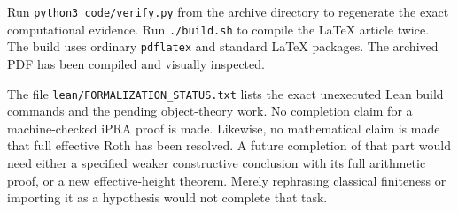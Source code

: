 Run \texttt{python3 code/verify.py} from the archive directory to regenerate
the exact computational evidence.  Run \texttt{./build.sh} to compile the
LaTeX article twice.  The build uses ordinary \texttt{pdflatex} and standard
LaTeX packages.  The archived PDF has been compiled and visually inspected.

The file \texttt{lean/FORMALIZATION\_STATUS.txt} lists the exact unexecuted
Lean build commands and the pending object-theory work.  No completion claim
for a machine-checked iPRA proof is made.  Likewise, no mathematical claim is
made that full effective Roth has been resolved.  A future completion of
that part would need either a specified weaker constructive conclusion with
its full arithmetic proof, or a new effective-height theorem.  Merely
rephrasing classical finiteness or importing it as a hypothesis would not
complete that task.
